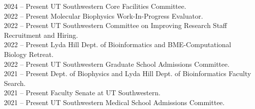 2024 -- Present \hspace{14pt} UT Southwestern Core Facilities Committee. \\
2022 -- Present \hspace{14pt} Molecular Biophysics Work-In-Progress Evaluator. \\
2022 -- Present \hspace{14pt} UT Southwestern Committee on Improving Research Staff Recruitment and Hiring. \\
2022 -- Present \hspace{14pt} Lyda Hill Dept. of Bioinformatics and BME-Computational Biology Retreat. \\
2022 -- Present \hspace{14pt} UT Southwestern Graduate School Admissions Committee. \\
2021 -- Present \hspace{14pt} Dept. of Biophysics and Lyda Hill Dept. of Bioinformatics Faculty Search. \\
2021 -- Present \hspace{14pt} Faculty Senate at UT Southwestern.  \\
2021 -- Present \hspace{14pt} UT Southwestern Medical School Admissions Committee.